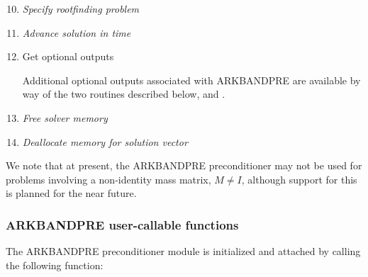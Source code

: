 \documentclass[letterpaper,10pt,english]{sphinxmanual}
\begin{document}
\begin{enumerate}
\setcounter{enumi}{9}
\item {} 
\emph{Specify rootfinding problem}

\item {} 
\emph{Advance solution in time}

\item {} 
Get optional outputs

Additional optional outputs associated with ARKBANDPRE are
available by way of the two routines described below,
{\hyperref[c_interface/Preconditioners:c.ARKBandPrecGetWorkSpace]{\emph{}}} and
{\hyperref[c_interface/Preconditioners:c.ARKBandPrecGetNumRhsEvals]{\emph{}}}.

\item {} 
\emph{Free solver memory}

\item {} 
\emph{Deallocate memory for solution vector}

\end{enumerate}

We note that at present, the ARKBANDPRE preconditioner may not be
used for problems involving a non-identity mass matrix, \(M\ne
I\), although support for this is planned for the near future.


\subsubsection{ARKBANDPRE user-callable functions}
\label{c_interface/Preconditioners:arkbandpre-user-callable-functions}
The ARKBANDPRE preconditioner module is initialized and attached
by calling the following function:
\end{document}
